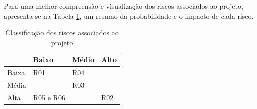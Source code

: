 Para uma melhor compreensão e visualização dos riscos associados ao projeto, apresenta-se na Tabela \ref{tab:riscos}, um resumo da probabilidade e o impacto de cada risco.

\begin{table}[ht!]
	\centering
	\begin{tabular}{ | l | l | l | l |}
		\hline
		\diagbox[width=15em]{Impacto}{Probabilidade}
		& Baixo & Médio & Alto\\
		\hline
		Baixa & \cellcolor{green}\centering R01 & \cellcolor{yellow}R04& \cellcolor{orange}\\
		\hline
		Média & \cellcolor{yellow} & \cellcolor{orange}R03 & \cellcolor{darkOrange}\\
		\hline
		Alta & \cellcolor{orange}R05 e R06 & \cellcolor{darkOrange} & \cellcolor{red}R02\\
		\hline
	\end{tabular}
	\begin{center}
		\caption {Classificação dos riscos associados ao projeto}
		\label {tab:riscos}
	\end{center}
\end{table}





\glsresetall



